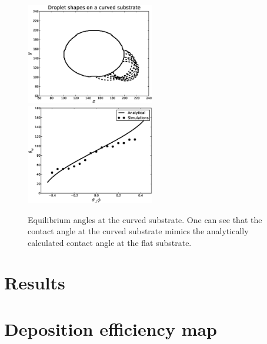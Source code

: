 \documentclass{article}
\begin{document}
\begin{figure}
\includegraphics[width=0.5\textwidth]{Figures/droplet_shapes_curved_substrates.eps}
\includegraphics[width=0.5\textwidth]{Figures/main_curve_circle.eps}\\
\caption{Equilibrium angles at the curved substrate. One can see that the contact angle at the curved substrate mimics the analytically calculated contact angle at the flat substrate. \label{fig:equilibrium:droplet:curved}}
\end{figure}

\section{Results}

\section{Deposition efficiency map}
\end{document}
